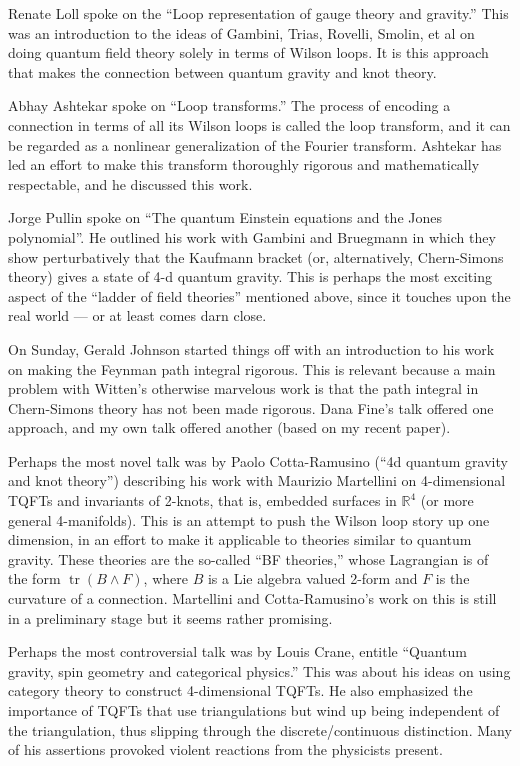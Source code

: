 \documentclass{article}
\begin{document}
Renate Loll spoke on the ``Loop representation of gauge theory and
gravity.'' This was an introduction to the ideas of Gambini, Trias,
Rovelli, Smolin, et al on doing quantum field theory solely in terms of
Wilson loops. It is this approach that makes the connection between
quantum gravity and knot theory.

Abhay Ashtekar spoke on ``Loop transforms.'' The process of encoding a
connection in terms of all its Wilson loops is called the loop
transform, and it can be regarded as a nonlinear generalization of the
Fourier transform. Ashtekar has led an effort to make this transform
thoroughly rigorous and mathematically respectable, and he discussed
this work.

Jorge Pullin spoke on ``The quantum Einstein equations and the Jones
polynomial''. He outlined his work with Gambini and Bruegmann in which
they show perturbatively that the Kaufmann bracket (or, alternatively,
Chern-Simons theory) gives a state of 4-d quantum gravity. This is
perhaps the most exciting aspect of the ``ladder of field theories''
mentioned above, since it touches upon the real world --- or at least
comes darn close.

On Sunday, Gerald Johnson started things off with an introduction to his
work on making the Feynman path integral rigorous. This is relevant
because a main problem with Witten's otherwise marvelous work is that
the path integral in Chern-Simons theory has not been made rigorous.
Dana Fine's talk offered one approach, and my own talk offered another
(based on my recent paper).

Perhaps the most novel talk was by Paolo Cotta-Ramusino (``4d quantum
gravity and knot theory'') describing his work with Maurizio Martellini
on 4-dimensional TQFTs and invariants of 2-knots, that is, embedded
surfaces in \(\mathbb{R}^4\) (or more general 4-manifolds). This is an
attempt to push the Wilson loop story up one dimension, in an effort to
make it applicable to theories similar to quantum gravity. These
theories are the so-called ``BF theories,'' whose Lagrangian is of the
form \(\operatorname{tr}(B \wedge F)\), where \(B\) is a Lie algebra
valued 2-form and \(F\) is the curvature of a connection. Martellini and
Cotta-Ramusino's work on this is still in a preliminary stage but it
seems rather promising.

Perhaps the most controversial talk was by Louis Crane, entitle
``Quantum gravity, spin geometry and categorical physics.'' This was
about his ideas on using category theory to construct 4-dimensional
TQFTs. He also emphasized the importance of TQFTs that use
triangulations but wind up being independent of the triangulation, thus
slipping through the discrete/continuous distinction. Many of his
assertions provoked violent reactions from the physicists present.
\end{document}
